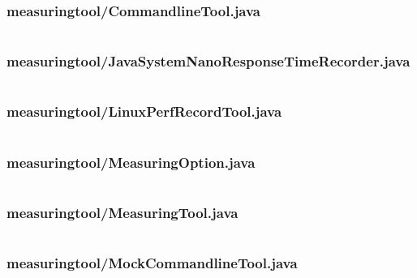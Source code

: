 \documentclass[a4paper,11pt]{article}
\begin{document}
\subsubsection{measuringtool/CommandlineTool.java}
\inputminted[fontsize=\footnotesize, linenos, numbersep=5pt, tabsize=4, frame=topline,framesep=0.8cm]{java}{/home/tituomin/StudioProjects/nativebenchmark/src/fi/helsinki/cs/tituomin/nativebenchmark/measuringtool/CommandlineTool.java}
\vspace{1cm}
\subsubsection{measuringtool/JavaSystemNanoResponseTimeRecorder.java}
\inputminted[fontsize=\footnotesize, linenos, numbersep=5pt, tabsize=4, frame=topline,framesep=0.8cm]{java}{/home/tituomin/StudioProjects/nativebenchmark/src/fi/helsinki/cs/tituomin/nativebenchmark/measuringtool/JavaSystemNanoResponseTimeRecorder.java}
\vspace{1cm}
\subsubsection{measuringtool/LinuxPerfRecordTool.java}
\inputminted[fontsize=\footnotesize, linenos, numbersep=5pt, tabsize=4, frame=topline,framesep=0.8cm]{java}{/home/tituomin/StudioProjects/nativebenchmark/src/fi/helsinki/cs/tituomin/nativebenchmark/measuringtool/LinuxPerfRecordTool.java}
\vspace{1cm}
\subsubsection{measuringtool/MeasuringOption.java}
\inputminted[fontsize=\footnotesize, linenos, numbersep=5pt, tabsize=4, frame=topline,framesep=0.8cm]{java}{/home/tituomin/StudioProjects/nativebenchmark/src/fi/helsinki/cs/tituomin/nativebenchmark/measuringtool/MeasuringOption.java}
\vspace{1cm}
\subsubsection{measuringtool/MeasuringTool.java}
\inputminted[fontsize=\footnotesize, linenos, numbersep=5pt, tabsize=4, frame=topline,framesep=0.8cm]{java}{/home/tituomin/StudioProjects/nativebenchmark/src/fi/helsinki/cs/tituomin/nativebenchmark/measuringtool/MeasuringTool.java}
\vspace{1cm}
\subsubsection{measuringtool/MockCommandlineTool.java}
\inputminted[fontsize=\footnotesize, linenos, numbersep=5pt, tabsize=4, frame=topline,framesep=0.8cm]{java}{/home/tituomin/StudioProjects/nativebenchmark/src/fi/helsinki/cs/tituomin/nativebenchmark/measuringtool/MockCommandlineTool.java}
\vspace{1cm}
\end{document}
